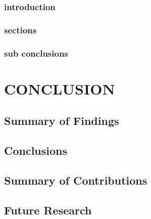\documentclass[]{book}
\theoremstyle{definition}
\theoremstyle{definition}
\theoremstyle{definition}
\theoremstyle{remark}
\begin{document}
\subsection{introduction}\label{introduction-5}

\subsection{sections}\label{sections-2}

\subsection{sub conclusions}\label{sub-conclusions-2}

\chapter{CONCLUSION}\label{conclusion-2}

\section{Summary of Findings}\label{summary-of-findings}

\section{Conclusions}\label{conclusions}

\section{Summary of Contributions}\label{summary-of-contributions}

\section{Future Research}\label{future-research}


\end{document}
